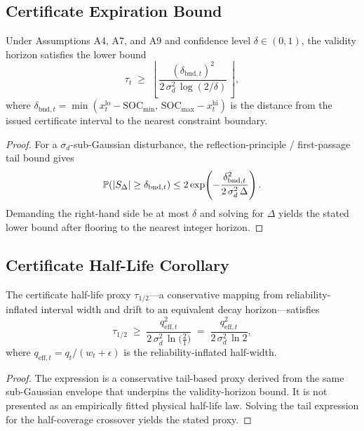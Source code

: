 \subsection{Certificate Expiration Bound}

\begin{theorem}
\label{thm:cert-expiration}
Under Assumptions A4, A7, and A9 and confidence level $\delta\in(0,1)$, the
validity horizon satisfies the lower bound
\[
  \tau_t \;\ge\;
  \left\lfloor\,\frac{(\delta_{\text{bnd},t})^2}
  {2\,\sigma_d^2\,\log(2/\delta)}\,\right\rfloor,
\]
where $\delta_{\text{bnd},t} = \min(x_t^{\text{lo}} - \text{SOC}_{\min},\,
\text{SOC}_{\max} - x_t^{\text{hi}})$ is the distance from the issued
certificate interval to the nearest constraint boundary.
\end{theorem}

\begin{proof}
For a $\sigma_d$-sub-Gaussian disturbance, the reflection-principle /
first-passage tail bound gives
\[
  \operatorname{\mathbb{P}}(|S_\Delta| \ge \delta_{\text{bnd},t})
  \le
  2\exp\!\left(
    -\frac{\delta_{\text{bnd},t}^2}{2\,\sigma_d^2\,\Delta}
  \right).
\]
Demanding the right-hand side be at most $\delta$ and solving for $\Delta$
yields the stated lower bound after flooring to the nearest integer horizon.
\end{proof}

\subsection{Certificate Half-Life Corollary}

\begin{corollary}
\label{cor:half-life}
The certificate half-life proxy $\tau_{1/2}$---a conservative mapping from
reliability-inflated interval width and drift to an equivalent decay
horizon---satisfies
\[
  \tau_{1/2} \;\ge\;
  \frac{q_{\mathrm{eff},t}^2}
  {2\,\sigma_d^2\,\ln\!\bigl(\tfrac{2}{1}\bigr)}
  \;=\;
  \frac{q_{\mathrm{eff},t}^2}{2\,\sigma_d^2\,\ln 2},
\]
where $q_{\mathrm{eff},t} = q_t / (w_t + \epsilon)$ is the
reliability-inflated half-width.
\end{corollary}

\begin{proof}
The expression is a conservative tail-based proxy derived from the same
sub-Gaussian envelope that underpins the validity-horizon bound.  It is not
presented as an empirically fitted physical half-life law.  Solving the tail
expression for the half-coverage crossover yields the stated proxy.
\end{proof}

